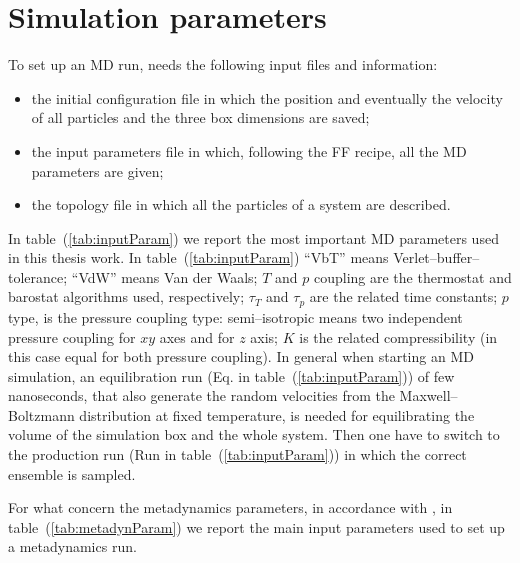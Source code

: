 \section{Simulation parameters}
To set up an \ac{MD} run, \gromacs needs the following input files and information:
\begin{itemize}
	\item the initial configuration file in which the position and eventually the velocity of all particles and the three box dimensions are saved;
	\item the input parameters file in which, following the \ac{FF} recipe, all the \ac{MD} parameters are given;
	\item the topology file in which all the particles of a system are described.%
\end{itemize}

In table~(\ref{tab:inputParam}) we report the most important \ac{MD} parameters used in this thesis work. In table~(\ref{tab:inputParam}) ``VbT'' means Verlet--buffer--tolerance; ``VdW'' means Van der Waals; $T$ and $p$ coupling are the thermostat and barostat algorithms used, respectively; $\tau_T$ and $\tau_p$ are the related time constants; $p$ type, is the pressure coupling type: semi--isotropic means two independent pressure coupling for $xy$ axes and for $z$ axis; $K$ is the related compressibility (in this case equal for both pressure coupling). In general when starting an \ac{MD} simulation, an equilibration run (Eq. in table~(\ref{tab:inputParam})) of few nanoseconds, that also generate the random velocities from the Maxwell–Boltzmann distribution at fixed temperature, is needed for equilibrating the volume of the simulation box and the whole system. Then one have to switch to the production run (Run in table~(\ref{tab:inputParam})) in which the correct ensemble is sampled. 

For what concern the metadynamics parameters, in accordance with \cite{ourPaper}, in table~(\ref{tab:metadynParam}) we report the main input parameters used to set up a metadynamics run.

